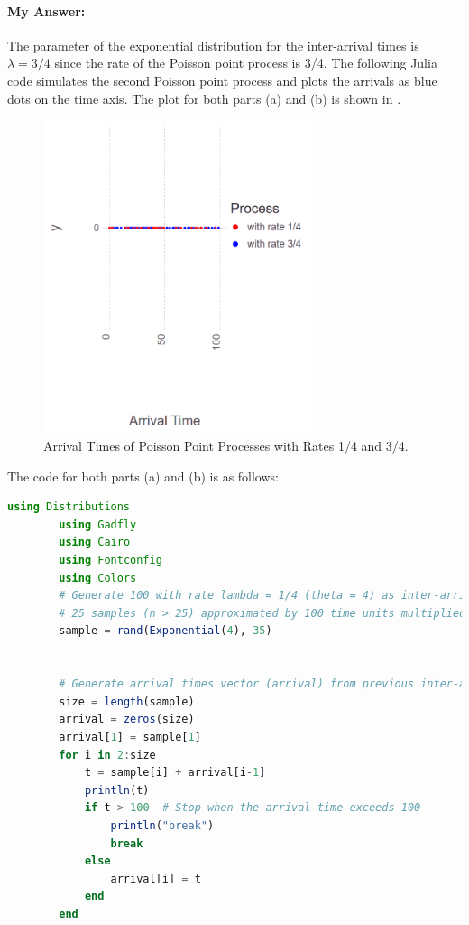 \documentclass{article}
\begin{document}
\begin{enumerate}[label=(\alph*)]
    \paragraph{My Answer:} The parameter of the exponential distribution for the inter-arrival times is \( \lambda = 3/4 \) since the rate of the Poisson point process is 3/4. The following Julia code simulates the second Poisson point process and plots the arrivals as blue dots on the time axis.
    The plot for both parts (a) and (b) is shown in .
    \begin{figure}[h!]
        \centering
        \includegraphics[width=0.7\textwidth]{arrival_times.png}
        \caption{Arrival Times of Poisson Point Processes with Rates 1/4 and 3/4.}\label{fig:arrival_times}
    \end{figure}
    
    The code for both parts (a) and (b) is as follows:
    \begin{lstlisting}[language=Julia, gobble=8]
        using Distributions
        using Gadfly
        using Cairo
        using Fontconfig
        using Colors
        # Generate 100 with rate lambda = 1/4 (theta = 4) as inter-arrival times for at least 
        # 25 samples (n > 25) approximated by 100 time units multiplied by rate (1/4 samples per time unit)
        sample = rand(Exponential(4), 35)
        
        
        # Generate arrival times vector (arrival) from previous inter-arrival times vector (intarrival)
        size = length(sample)
        arrival = zeros(size)
        arrival[1] = sample[1]
        for i in 2:size
            t = sample[i] + arrival[i-1]
            println(t)
            if t > 100  # Stop when the arrival time exceeds 100
                println("break")
                break
            else
                arrival[i] = t
            end
        end
        

\end{lstlisting}
\end{enumerate}
\end{document}
